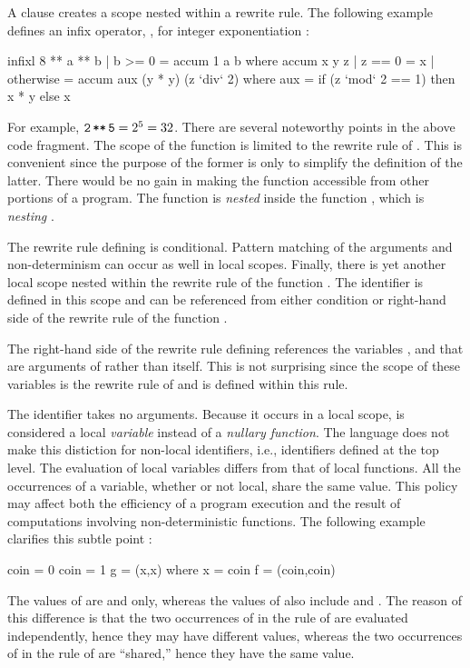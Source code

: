 A 
clause creates a scope nested within a rewrite rule.
The following example defines an infix operator, \ccode{**}, for
integer exponentiation
:
%
\begin{prog}
infixl 8 **
\medskip
a ** b | b >= 0 = accum 1 a b
   where accum x y z | z == 0    = x
                     | otherwise = accum aux (y * y) (z `div` 2)
           where aux = if (z `mod` 2 == 1) then x * y else x
\end{prog}
%
For example, $\code{2\,**\,5}=2^5=32$.
There are several noteworthy points in the above code fragment.
The scope of the function  is limited to
the rewrite rule of \ccode{**}.
This is convenient since the purpose of the former
is only to simplify the definition of the latter.
There would be no gain in making the function 
accessible from other portions of a program.
The function  is \emph{nested}
inside the function \ccode{**}, which is \emph{nesting} .  

The rewrite rule defining  is conditional.
Pattern matching of the arguments and non-determinism
can occur as well in local scopes.
Finally, there is yet another local scope nested
within the rewrite rule of the function .
The identifier  is defined in this scope
and can be referenced from either condition or right-hand side
of the rewrite rule of the function .

The right-hand side of the rewrite rule defining 
references the variables ,  and 
that are arguments of  rather than  itself.
This is not surprising since the scope of these variables
is the rewrite rule of  and 
is defined within this rule.

The identifier  takes no arguments.
Because it occurs in a local scope,
 is considered
a local \emph{variable}
instead of a \emph{nullary function}.
The language does not make this distiction for non-local
identifiers, i.e., identifiers defined at the top level.
The evaluation of local variables differs from that of local functions.
All the occurrences of a variable,
whether or not local, share the same value.
This policy may affect both the efficiency of a program execution
and the result of computations involving non-deterministic
functions.  The following example clarifies this subtle point
:
%
\begin{prog}
coin = 0
coin = 1
\medskip
g = (x,x) where x = coin
\medskip
f = (coin,coin)
\end{prog}
%
The values of  are  and  only,
whereas the values of  also include 
 and .
The reason of this difference
is that the two occurrences of  in the rule of 
are evaluated independently, hence they may have different values,
whereas the two occurrences of 
in the rule of  are ``shared,'' hence they have the same value.

